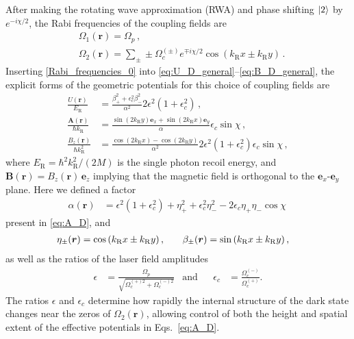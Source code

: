 \documentclass[aps,pra,twocolumn,showpacs,superscriptaddress,floatfix,longbibliography]{revtex4-1}
\newcommand{\eg}[1]{{\color{blue}[Edvinas: #1]}}
\def\kr{k_{\mathrm R}}                            			%
\def\Er{E_{\mathrm R}}                            			%
\def\Udd{U}
\def\Add{{\mathbf A}}
\def\Bdd{{\mathbf B}}
\def\ex{\boldsymbol{e}_x}
\def\ey{\boldsymbol{e}_y}
\def\ez{\boldsymbol{e}_z}
\begin{document}
After making the rotating wave approximation (RWA) and phase shifting $\ket{2}$ by $e^{-i \chi / 2}$, the Rabi frequencies of the coupling fields are
\begin{align}
& \Omega_{1}(\boldsymbol{r}) = \Omega_p \, , \label{Rabi_frequencies_0} \\
& \Omega_{2}(\boldsymbol{r})= \sum_\pm \pm \Omega^{(\pm)}_{c} e^{\mp i\chi/2} \cos(\kr x \pm \kr y)\, . \nonumber
\end{align}
Inserting \eqref{Rabi_frequencies_0} into \eqref{eq:U_D_general}--\eqref{eq:B_D_general}, the explicit forms of the geometric potentials for this choice of coupling fields are
%
\begin{align}
\frac{\Udd (\boldsymbol{r})}{\Er} &= \frac{ \beta^{2}_{+}+ \epsilon^2_c \beta^{2}_{-}}{\alpha^2} 2\epsilon^{2} (1+\epsilon_c^2) \, ,
\nonumber\\
\frac{\Add (\boldsymbol{r})}{\hbar \kr} &= \frac{ \sin{(2\kr y)} \mathbf{e}_x + \sin{(2\kr x) \mathbf{e}_y } }{\alpha} \epsilon_c \sin{\chi} \, ,
\label{eq:A_D} \\
\frac{B_{z} (\boldsymbol{r})}{\hbar \kr^2} &= \frac{ \cos{(2 \kr x)} - \cos{(2 \kr y)}   }{\alpha^2} 2 \epsilon^{2} (1+\epsilon_c^2) \epsilon_c \sin{\chi} \, ,
\nonumber
\end{align}
%
where $\Er=\hbar^{2}\kr^{2}/(2M)$ is the single photon recoil energy, and $\Bdd(\boldsymbol{r}) = B_{z}(\boldsymbol{r}) \, \ez$ implying that the magnetic field is orthogonal to the $\ex$-$\ey$ plane. 
Here we defined a factor
%
\begin{align*}
\alpha{(\boldsymbol{r})} &= \epsilon^2 (1 + \epsilon_c^2) + \eta^2_{+} + \epsilon_c^2 \eta^2_{-} - 2 \epsilon_c \eta_+ \eta_- \cos{\chi} \,
\end{align*}
%
present in \eqref{eq:A_D}, and
%
\begin{align*}
\eta_{\pm}(\boldsymbol{r}) &= \cos{(\kr x \pm \kr y)} \, , & {\rm} && \beta_{\pm}(\boldsymbol{r}) &= \sin{(\kr x \pm \kr y)} \, ,
\end{align*}
%
%
as well as the ratios of the laser field amplitudes
\begin{align}
\epsilon &= \frac{\Omega_p}{\sqrt{ \Omega_c^{(+)2} + \Omega_c^{(-)2} } }& \text{and} && \epsilon_c &= \frac{\Omega^{(-)}_{c} }{ \Omega^{(+)}_{c}}. \label{eq:epsilon}
\end{align}
The ratios $\epsilon$ and $\epsilon_c$ determine how rapidly the internal structure of the dark state changes near the zeros of $\Omega_2(\boldsymbol{r})$, allowing control of both the height and spatial extent of the effective potentials in Eqs.~\eqref{eq:A_D}.
\end{document}
